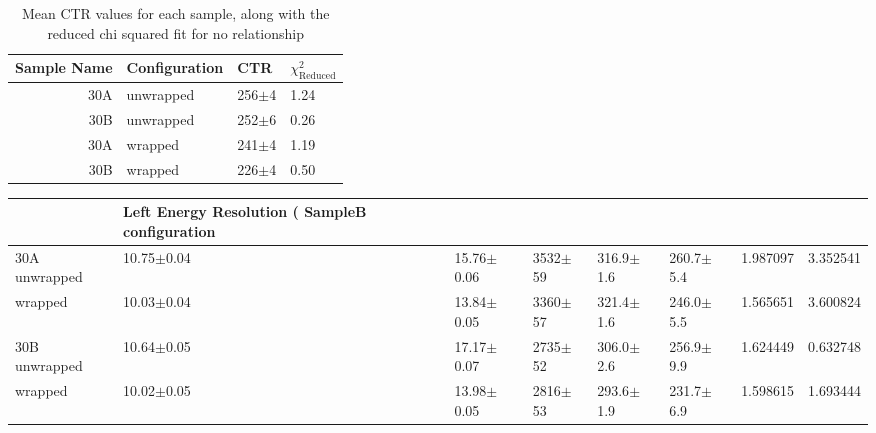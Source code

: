 \begin{table}
\caption{\label{tab:doiresults} Mean CTR values for each sample, along with the reduced chi squared fit for no relationship}
\begin{tabular}{rlll}
\hline
Sample Name & Configuration & CTR &  $\chi^2_\text{Reduced}$ \\
\hline
        30A &     unwrapped &  256$\pm$4 &                    1.24 \\
        30B &     unwrapped &  252$\pm$6 &                    0.26 \\
        30A &       wrapped &  241$\pm$4 &                    1.19 \\
        30B &       wrapped &  226$\pm$4 &                    0.50 \\
\hline
\end{tabular}
\end{table}

\begin{tabular}{llllllrr}
\toprule
{} & Left Energy Resolution (%
SampleB configuration &                      &                  &              &                &                &             &                        \\
\midrule
30A     unwrapped     &       10.75$\pm$0.04 &   15.76$\pm$0.06 &  3532$\pm$59 &  316.9$\pm$1.6 &  260.7$\pm$5.4 &    1.987097 &               3.352541 \\
        wrapped       &       10.03$\pm$0.04 &   13.84$\pm$0.05 &  3360$\pm$57 &  321.4$\pm$1.6 &  246.0$\pm$5.5 &    1.565651 &               3.600824 \\
30B     unwrapped     &       10.64$\pm$0.05 &   17.17$\pm$0.07 &  2735$\pm$52 &  306.0$\pm$2.6 &  256.9$\pm$9.9 &    1.624449 &               0.632748 \\
        wrapped       &       10.02$\pm$0.05 &   13.98$\pm$0.05 &  2816$\pm$53 &  293.6$\pm$1.9 &  231.7$\pm$6.9 &    1.598615 &               1.693444 \\
\bottomrule
\end{tabular}